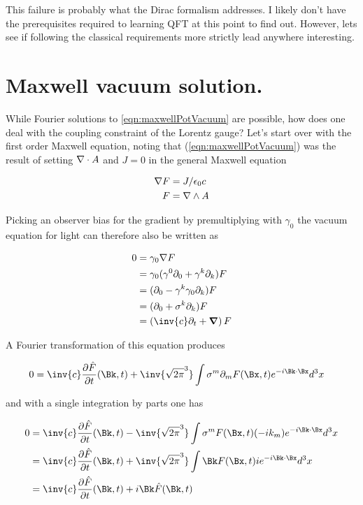 \documentclass[]{eliblog}
\begin{document}
This failure is probably what the Dirac formalism addresses.  I likely don't have the prerequisites required to learning QFT at this point to find out.  However, lets see if following the classical requirements more strictly lead anywhere interesting.

\section{Maxwell vacuum solution.}

While Fourier solutions to \ref{eqn:maxwellPotVacuum} are possible, how does one deal with the coupling constraint of the Lorentz gauge?  Let's start
over with the first order Maxwell equation, noting that (\ref{eqn:maxwellPotVacuum}) was the result of setting $\nabla \cdot A$ and $J = 0$ in the
general Maxwell equation

\begin{align}
\nabla F &= J/\epsilon_0 c \\
F &= \nabla \wedge A
\end{align}

Picking an observer bias for the gradient by premultiplying with $\gamma_0$ the vacuum equation for light can therefore also be written as

\begin{align*}
0 
&= \gamma_0 \grad F \\
&= \gamma_0 (\gamma^0 \partial_0 + \gamma^k \partial_k) F \\
&= (\partial_0 - \gamma^k \gamma_0 \partial_k) F \\
&= (\partial_0 + \sigma^k \partial_k) F \\
&= \left(\inv{c}\partial_t + \spacegrad \right) F \\
\end{align*}

A Fourier transformation of this equation produces

\begin{align*}
0 &= \inv{c} \PD{t}{\hat{F}}(\Bk,t) + \inv{\sqrt{2\pi}^3} \int \sigma^m \partial_m F(\Bx,t) e^{-i \Bk \cdot \Bx} d^3 x
\end{align*}

and with a single integration by parts one has

\begin{align*}
0 
&= \inv{c} \PD{t}{\hat{F}}(\Bk,t) - \inv{\sqrt{2\pi}^3} \int \sigma^m F(\Bx,t) (-i k_m) e^{-i \Bk \cdot \Bx} d^3 x \\
&= \inv{c} \PD{t}{\hat{F}}(\Bk,t) + \inv{\sqrt{2\pi}^3} \int \Bk F(\Bx,t) i e^{-i \Bk \cdot \Bx} d^3 x \\
&= \inv{c} \PD{t}{\hat{F}}(\Bk,t) + i \Bk \hat{F}(\Bk,t)
\end{align*}
\end{document}
